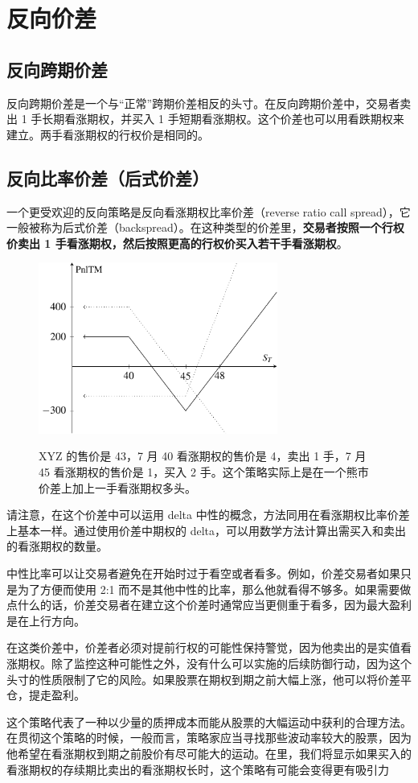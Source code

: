 \chapter{反向价差}
\section{反向跨期价差}
反向跨期价差是一个与“正常”跨期价差相反的头寸。在反向跨期价差中，交易者卖出 1 手长期看涨期权，并买入 1 手短期看涨期权。这个价差也可以用看跌期权来建立。两手看涨期权的行权价是相同的。

\section{反向比率价差（后式价差）}
一个更受欢迎的反向策略是反向看涨期权比率价差（reverse ratio call spread），它一般被称为后式价差（backspread）。在这种类型的价差里，\textbf{交易者按照一个行权价卖出 1 手看涨期权，然后按照更高的行权价买入若干手看涨期权}。

\begin{figure}[h]
    \centering
    \includegraphics[width=0.7\textwidth]{IMG/Reverse ratio spread.pdf}
    \label{fig:Reverse ratio spread}
    \caption{XYZ 的售价是 43，7 月 40 看涨期权的售价是 4，卖出 1 手，7 月 45 看涨期权的售价是 1，买入 2 手。这个策略实际上是在一个熊市价差上加上一手看涨期权多头。}
\end{figure}

请注意，在这个价差中可以运用 delta 中性的概念，方法同用在看涨期权比率价差上基本一样。通过使用价差中期权的 delta，可以用数学方法计算出需买入和卖出的看涨期权的数量。

中性比率可以让交易者避免在开始时过于看空或者看多。例如，价差交易者如果只是为了方便而使用 2:1 而不是其他中性的比率，那么他就看得不够多。如果需要做点什么的话，价差交易者在建立这个价差时通常应当更侧重于看多，因为最大盈利是在上行方向。

在这类价差中，价差者必须对提前行权的可能性保持警觉，因为他卖出的是实值看涨期权。除了监控这种可能性之外，没有什么可以实施的后续防御行动，因为这个头寸的性质限制了它的风险。如果股票在期权到期之前大幅上涨，他可以将价差平仓，提走盈利。

这个策略代表了一种以少量的质押成本而能从股票的大幅运动中获利的合理方法。在贯彻这个策略的时候，一般而言，策略家应当寻找那些波动率较大的股票，因为他希望在看涨期权到期之前股价有尽可能大的运动。在里，我们将显示如果买入的看涨期权的存续期比卖出的看涨期权长时，这个策略有可能会变得更有吸引力